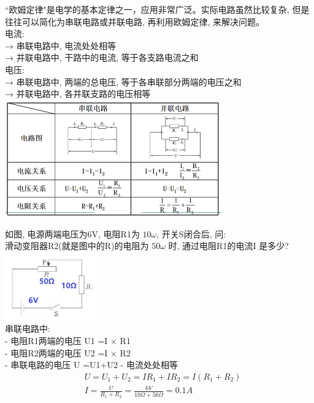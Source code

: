 \documentclass[UTF8]{ctexart}
\begin{document}
	``欧姆定律"是电学的基本定律之一，应用非常广泛。实际电路虽然比较复杂, 但是往往可以简化为串联电路或并联电路, 再利用欧姆定律, 来解决问题。 \\
	
	电流: \\
	→ 串联电路中, 电流处处相等 \\
	→ 并联电路中, 干路中的电流, 等于各支路电流之和 \\
	
	电压: \\
	→ 串联电路中, 两端的总电压, 等于各串联部分两端的电压之和 \\
	→ 并联电路中, 各并联支路的电压相等 \\
	
	
	\includegraphics[width=0.7\textwidth]{img/0057.png} \\
	
	
	
	\begin{tcolorbox}[title = {例},boxrule={0.1em},colframe={black!10}, colback={black!3},colbacktitle={black!10},coltitle={black}]
	如图, 电源两端电压为6V, 电阻R1为 $10 \omega$, 开关S闭合后, 问: \\	
	滑动变阻器R2(就是图中的R)的电阻为 $50 \omega$ 时, 通过电阻R1的电流I 是多少? 
		\includegraphics[width=0.3\textwidth]{img/0056.png} \\	
		串联电路中: \\
		- 电阻R1两端的电压 U1 =I × R1 \\
		- 电阻R2两端的电压 U2 =I × R2 \\
		- 串联电路的电压 U =U1+U2 		
		- 电流处处相等 \\
		\begin{align*}
			& U=U_1+U_2=IR_1+IR_2=I\left( R_1+R_2 \right)\\
			& I=\frac{U}{R_1+R_2}=\frac{6V}{10\varOmega +50\varOmega}=0.1A\\
		\end{align*}	
	\end{tcolorbox}
	
\end{document}
